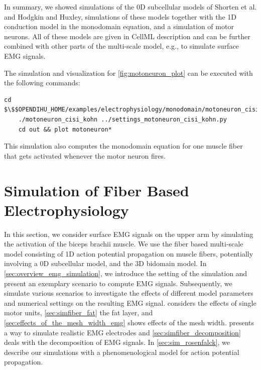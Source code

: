 In summary, we showed simulations of the 0D subcellular models of Shorten et al. and Hodgkin and Huxley, simulations of these models together with the 1D conduction model in the monodomain equation, and a simulation of motor neurons. All of these models are given in CellML description and can be further combined with other parts of the multi-scale model, e.g., to simulate surface EMG signals.

\begin{reproduce_no_break}
  The simulation and visualization for \cref{fig:motoneuron_plot} can be executed with the following commands:
  \begin{lstlisting}[columns=fullflexible,breaklines=true,postbreak=\mbox{\textcolor{gray}{$\hookrightarrow$}\space}]
    cd $\$$OPENDIHU_HOME/examples/electrophysiology/monodomain/motoneuron_cisi_kohn/build_release
    ./motoneuron_cisi_kohn ../settings_motoneuron_cisi_kohn.py
    cd out && plot motoneuron*
  \end{lstlisting}
  This simulation also computes the monodomain equation for one muscle fiber that gets activated whenever the motor neuron fires.
\end{reproduce_no_break}

%

%

\section{Simulation of Fiber Based Electrophysiology}\label{sec:results_fiber_based_electrophysiology}
%

In this section, we consider surface EMG signals on the upper arm by simulating the activation of the biceps brachii muscle. We use the fiber based multi-scale model consisting of 1D action potential propagation on muscle fibers, potentially involving a 0D subcellular model, and the 3D bidomain model.
In \cref{sec:overview_emg_simulation}, we introduce the setting of the simulation and present an exemplary scenario to compute EMG signals.
Subsequently, we simulate various scenarios to investigate the effects of different model parameters and numerical settings on the resulting EMG signal.  considers the effects of single motor units, \cref{sec:simfiber_fat} the fat layer, and \cref{sec:effects_of_the_mesh_width_emg} shows effects of the mesh width.  presents a way to simulate realistic EMG electrodes and \cref{sec:simfiber_decomposition} deals with the decomposition of EMG signals.
In \cref{sec:sim_rosenfalck}, we describe our simulations with a phenomenological model for action potential propagation.

